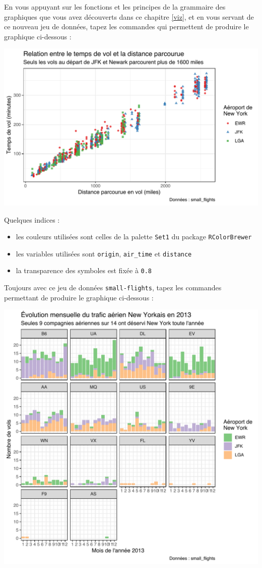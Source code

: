 \documentclass[a4paperpaper,]{article}
\providecommand{\tightlist}{%
  \setlength{\itemsep}{0pt}\setlength{\parskip}{0pt}}
\theoremstyle{definition}
\theoremstyle{definition}
\theoremstyle{definition}
\theoremstyle{remark}
\begin{document}
En vous appuyant sur les fonctions et les principes de la grammaire des
graphiques que vous avez découverts dans ce chapitre \ref{viz}, et en
vous servant de ce nouveau jeu de données, tapez les commandes qui
permettent de produire le graphique ci-dessous :

\begin{center}\includegraphics[width=0.9\linewidth]{figure/exercice-1} \end{center}

Quelques indices :

\begin{itemize}
\tightlist
\item
  les couleurs utilisées sont celles de la palette \texttt{Set1} du
  package \texttt{RColorBrewer}
\item
  les variables utilisées sont \texttt{origin}, \texttt{air\_time} et
  \texttt{distance}
\item
  la transparence des symboles est fixée à \texttt{0.8}
\end{itemize}

Toujours avec ce jeu de données \texttt{small-flights}, tapez les
commandes permettant de produire le graphique ci-dessous :

\begin{center}\includegraphics[width=0.9\linewidth]{figure/exercice2-1} \end{center}
\end{document}
